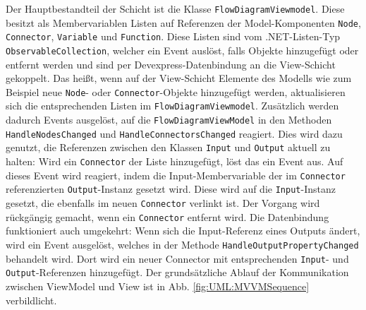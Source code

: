Der Hauptbestandteil der Schicht ist die Klasse \texttt{FlowDiagramViewmodel}. Diese besitzt als Membervariablen Listen auf Referenzen der Model-Komponenten \texttt{Node}, \texttt{Connector}, \texttt{Variable} und \texttt{Function}. Diese Listen sind vom .NET-Listen-Typ \texttt{ObservableCollection}, welcher ein Event auslöst, falls Objekte hinzugefügt oder entfernt werden und sind per Devexpress-Datenbindung an die View-Schicht gekoppelt. Das heißt, wenn auf der View-Schicht Elemente des Modells wie zum Beispiel neue \texttt{Node}- oder \texttt{Connector}-Objekte hinzugefügt werden, aktualisieren sich die entsprechenden Listen im \texttt{FlowDiagramViewmodel}. Zusätzlich werden dadurch Events ausgelöst, auf die \texttt{FlowDiagramViewModel} in den Methoden \texttt{HandleNodesChanged} und \texttt{HandleConnectorsChanged} reagiert. Dies wird dazu genutzt, die Referenzen zwischen den Klassen \texttt{Input} und \texttt{Output} aktuell zu halten: Wird ein \texttt{Connector} der Liste hinzugefügt, löst das ein Event aus. Auf dieses Event wird reagiert, indem die Input-Membervariable der im \texttt{Connector} referenzierten \texttt{Output}-Instanz gesetzt wird. 
\newpage
\noindent Diese wird auf die \texttt{Input}-Instanz gesetzt, die ebenfalls im neuen \texttt{Connector} verlinkt ist. Der Vorgang wird rückgängig gemacht, wenn ein \texttt{Connector} entfernt wird. Die Datenbindung funktioniert auch umgekehrt: Wenn sich die Input-Referenz eines Outputs ändert, wird ein Event ausgelöst, welches in der Methode \texttt{HandleOutputPropertyChanged} behandelt wird. Dort wird ein neuer Connector mit entsprechenden \texttt{Input}- und \texttt{Output}-Referenzen hinzugefügt. Der grundsätzliche Ablauf der Kommunikation zwischen ViewModel und View ist in Abb. \ref{fig:UML:MVVMSequence} verbildlicht.
